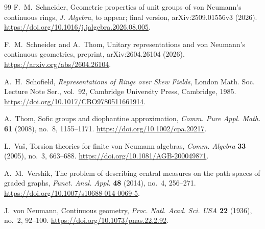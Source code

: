 \documentclass[11pt]{amsart}
\theoremstyle{definition}
\theoremstyle{remark}
\begin{document}
\begin{thebibliography}{99}
F.~M.~Schneider,
\newblock Geometric properties of unit groups of von Neumann's continuous rings,
\newblock \emph{J. Algebra}, to appear; final version, arXiv:2509.01556v3 (2026).
\newblock \url{https://doi.org/10.1016/j.jalgebra.2026.08.005}.

F.~M.~Schneider and A.~Thom,
\newblock Unitary representations and von Neumann's continuous geometries,
\newblock preprint, arXiv:2604.26104 (2026).
\newblock \url{https://arxiv.org/abs/2604.26104}.

A.~H.~Schofield,
\newblock \emph{Representations of Rings over Skew Fields},
\newblock London Math. Soc. Lecture Note Ser., vol.~92,
  Cambridge University Press, Cambridge, 1985.
\newblock \url{https://doi.org/10.1017/CBO9780511661914}.

A.~Thom,
\newblock Sofic groups and diophantine approximation,
\newblock \emph{Comm. Pure Appl. Math.} \textbf{61} (2008), no.~8,
  1155--1171.
\newblock \url{https://doi.org/10.1002/cpa.20217}.

L.~Va\v{s},
\newblock Torsion theories for finite von Neumann algebras,
\newblock \emph{Comm. Algebra} \textbf{33} (2005), no.~3, 663--688.
\newblock \url{https://doi.org/10.1081/AGB-200049871}.

A.~M.~Vershik,
\newblock The problem of describing central measures on the path spaces of
  graded graphs,
\newblock \emph{Funct. Anal. Appl.} \textbf{48} (2014), no.~4, 256--271.
\newblock \url{https://doi.org/10.1007/s10688-014-0069-5}.

J.~von Neumann,
\newblock Continuous geometry,
\newblock \emph{Proc. Natl. Acad. Sci. USA} \textbf{22} (1936), no.~2, 92--100.
\newblock \url{https://doi.org/10.1073/pnas.22.2.92}.

\end{thebibliography}
\end{document}

